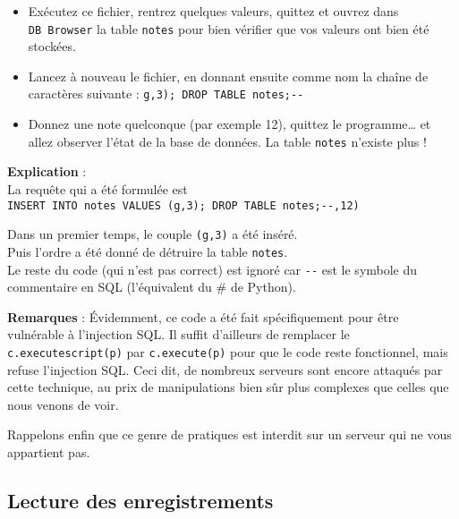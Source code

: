 \documentclass[
  a4paper,
  DIV=11,
  numbers=noendperiod]{scrartcl}
\providecommand{\tightlist}{%
  \setlength{\itemsep}{0pt}\setlength{\parskip}{0pt}}\usepackage{longtable,booktabs,array}
\begin{document}
\begin{itemize}
\tightlist
\item
  Exécutez ce fichier, rentrez quelques valeurs, quittez et ouvrez dans
  \texttt{DB\ Browser} la table \texttt{notes} pour bien vérifier que
  vos valeurs ont bien été stockées.
\item
  Lancez à nouveau le fichier, en donnant ensuite comme nom la chaîne de
  caractères suivante :
  \texttt{g\textquotesingle{},\textquotesingle{}3\textquotesingle{});\ DROP\ TABLE\ notes;-\/-}
\item
  Donnez une note quelconque (par exemple 12), quittez le
  programme\ldots{} et allez observer l'état de la base de données. La
  table \texttt{notes} n'existe plus !
\end{itemize}

\textbf{Explication} :\\
La requête qui a été formulée est
\texttt{INSERT\ INTO\ notes\ VALUES\ (\textquotesingle{}g\textquotesingle{},\textquotesingle{}3\textquotesingle{});\ DROP\ TABLE\ notes;-\/-\textquotesingle{},\textquotesingle{}12\textquotesingle{})}

Dans un premier temps, le couple
\texttt{(\textquotesingle{}g\textquotesingle{},\textquotesingle{}3\textquotesingle{})}
a été inséré.\\
Puis l'ordre a été donné de détruire la table \texttt{notes}.\\
Le reste du code (qui n'est pas correct) est ignoré car \texttt{-\/-}
est le symbole du commentaire en SQL (l'équivalent du \# de Python).

\textbf{Remarques} : Évidemment, ce code a été fait spécifiquement pour
être vulnérable à l'injection SQL. Il suffit d'ailleurs de remplacer le
\texttt{c.executescript(p)} par \texttt{c.execute(p)} pour que le code
reste fonctionnel, mais refuse l'injection SQL. Ceci dit, de nombreux
serveurs sont encore attaqués par cette technique, au prix de
manipulations bien sûr plus complexes que celles que nous venons de
voir.

Rappelons enfin que ce genre de pratiques est interdit sur un serveur
qui ne vous appartient pas.

\hypertarget{lecture-des-enregistrements}{%
\subsection{Lecture des
enregistrements}\label{lecture-des-enregistrements}}
\end{document}
